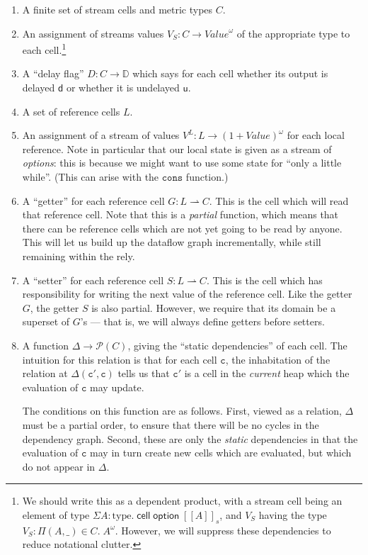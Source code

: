\documentclass[preprint]{sigplanconf}
\newcommand{\term}[1]{\ensuremath{\mathtt{{#1}}}}
\newcommand{\interps}[1]{[\![{#1}]\!]_s}
\newcommand{\celltype}[1]{\mathsf{cell}\;{#1}}
\newcommand{\opttype}[1]{\mathsf{option}\;{#1}}
\newcommand{\powerset}[1]{\mathcal{P}(#1)}
\newcommand{\Delays}{\mathbb{D}}
\newcommand{\U}{\mathsf{u}}
\newcommand{\D}{\mathsf{d}}
\begin{document}
\begin{enumerate}
\item A finite set of stream cells and metric types $C$. 
\item An assignment of streams values $V_S : C \to \mathit{Value}^\omega$ 
  of the appropriate type to each cell.\footnote{We should write this 
  as a dependent product, with a stream cell being an element of type 
  $\Sigma A:\mathrm{type}.\;\celltype{\opttype{\interps{A}}}$, and $V_S$ having
  the type $V_S : \Pi (A, \_) \in C.\; A^\omega$. However, we will suppress these 
  dependencies to reduce notational clutter.}
\item A ``delay flag'' $D : C \to \Delays$ which says for each cell whether 
  its output is delayed $\D$ or whether it is undelayed $\U$. 
\item A set of reference cells $L$. 
\item An assignment of a stream of values $V^L : L \to \mathit{(1 +
  \mathit{Value})^\omega}$ for each local reference. Note in
  particular that our local state is given as a stream of
  \emph{options}: this is because we might want to use some state for
  ``only a little while''. (This can arise with the \term{cons}
  function.)
\item A ``getter'' for each reference cell $G : L \rightharpoonup
  C$. This is the cell which will read that reference cell. Note that
  this is a \emph{partial} function, which means that there can be
  reference cells which are not yet going to be read by anyone. This
  will let us build up the dataflow graph incrementally, while still
  remaining within the rely. 
\item A ``setter'' for each reference cell $S : L \rightharpoonup
  C$. This is the cell which has responsibility for writing the next
  value of the reference cell. Like the getter $G$, the getter $S$ is
  also partial. However, we require that its domain be a superset of $G$'s ---
  that is, we will always define getters before setters. 

\item A function $\Delta \to \powerset{C}$, giving the
  ``static dependencies'' of each cell. The intuition for this
  relation is that for each cell \term{c}, the inhabitation of the
  relation at $\Delta(\term{c'},\term{c})$ tells us that \term{c'} is
  a cell in the \emph{current} heap which the evaluation of \term{c} may
  update. 

  The conditions on this function are as follows. First, viewed as a
  relation, $\Delta$ must be a partial order, to ensure that there
  will be no cycles in the dependency graph. Second, these are only
  the \emph{static} dependencies in that the evaluation of \term{c}
  may in turn create new cells which are evaluated, but which do not
  appear in $\Delta$. 
\end{enumerate}
\end{document}
